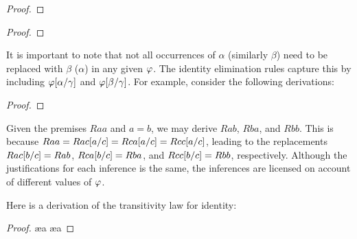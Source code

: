 \begin{multicols}{2}
  
\begin{proof}
	 
\end{proof}

\begin{proof}
	 
\end{proof}

\end{multicols}

It is important to note that not all occurrences of $\alpha$ (similarly $\beta$) need to be replaced with $\beta$ ($\alpha$) in any given $\varphi$.
The identity elimination rules capture this by including $\varphi[\alpha/\gamma]$ and $\varphi[\beta/\gamma]$.
For example, consider the following derivations:

\begin{proof}
   
    
    
\end{proof}

Given the premises $Raa$ and $a=b$, we may derive $Rab$, $Rba$, and $Rbb$.
This is because $Raa=Rac[a/c]=Rca[a/c]=Rcc[a/c]$, leading to the replacements $Rac[b/c]=Rab$, $Rca[b/c]=Rba$, and $Rcc[b/c]=Rbb$, respectively.
Although the justifications for each inference is the same, the inferences are licensed on account of different values of $\varphi$.

Here is a derivation of the transitivity law for identity:

\begin{proof}
	\open
		\pr{}
		 \ae{a}
		 \ae{a}
	\close
	 
	 
	 
	 
\end{proof}

